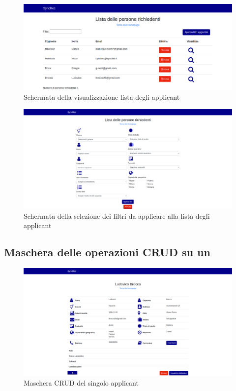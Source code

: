 \vspace{0.5em}
\begin{figure}[!h] 
	\centering 
	\includegraphics[width=1\columnwidth]{immagini/svil/lista} 
	\caption{Schermata della visualizzazione lista degli applicant}
	\label{figura:lista}
\end{figure}


\vspace{0.5em}
\begin{figure}[!h] 
	\centering 
	\includegraphics[width=1\columnwidth]{immagini/svil/filtri} 
	\caption{Schermata della selezione dei filtri da applicare alla lista degli applicant}
	\label{figura:filtri}
\end{figure}

\subsection{Maschera delle operazioni CRUD su un\applicant}
\vspace{0.5em}
\begin{figure}[!h] 
	\centering 
	\includegraphics[width=1\columnwidth]{immagini/svil/applicant}
	\caption{Maschera CRUD del singolo applicant}
	\label{figura:applicant}
\end{figure}


